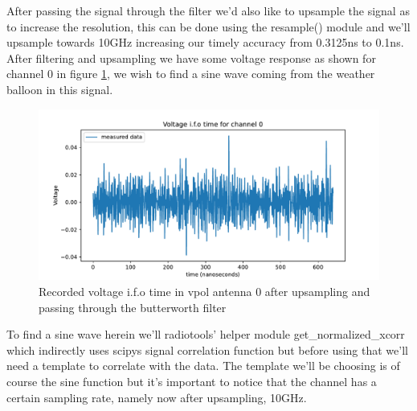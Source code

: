 \documentclass[11pt,a4paper,faculty=we,language=en,doctype=report]{cls/ugent-doc}
\begin{document}
After passing the signal through the filter we'd also like to upsample the
signal as to increase the resolution, this can be done using the resample()
module and we'll upsample towards 10GHz increasing our timely accuracy from
0.3125ns to 0.1ns.  After filtering and upsampling we have some voltage
response as shown for channel 0 in figure \ref{fig:VoltageAfterFilter}, we wish
to find a sine wave coming from the weather balloon in this signal.

\begin{figure}
	\centering
	\includegraphics[width=\textwidth]{figures/VoltageAfterFilter.pdf}
	\caption{Recorded voltage i.f.o time in vpol antenna 0 after upsampling and passing through the butterworth filter}
	\label{fig:VoltageAfterFilter}
\end{figure}

To find a sine wave herein we'll radiotools' helper module get\_normalized\_xcorr
which indirectly uses scipys signal correlation function but before using that we'll
need a template to correlate with the data. The template we'll be choosing is
of course the sine function but it's important to notice that the channel has a
certain sampling rate, namely now after upsampling, 10GHz. 
\end{document}
